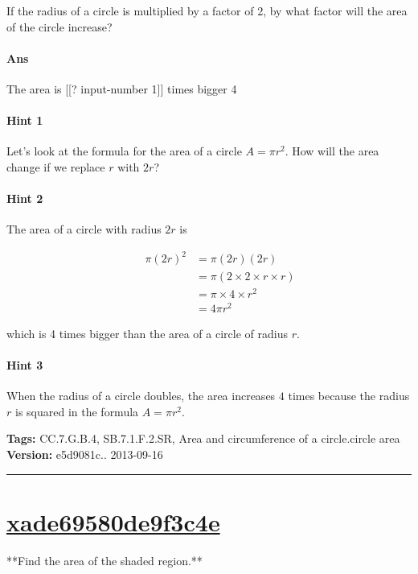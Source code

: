 \documentclass[twocolumn,10pt]{article}
\begin{document}
\noindent
If the radius of a circle is multiplied by a factor of 2, by what factor will the area of the circle increase?

\paragraph{Ans} The area is [[? input-number 1]] times bigger  4

\paragraph{Hint 1}Let's look at the formula for the area of a circle $A=\pi r^2$. 
How will the area change if we replace $r$ with $2r$?

\paragraph{Hint 2}The area of a circle with radius $2r$ is 

\begin{align*}
\qquad \pi (2r)^2 
  & =\pi(2r)(2r) \\
  &=\pi(2 \times 2 \times r \times r)  \\
   &= \pi \times 4 \times r^2 \\
   &= 4\pi r^2
\end{align*} 

which is 4 times bigger than the area of a circle of radius $r$. 


\paragraph{Hint 3}When the radius of a circle doubles, the area increases $4$ times because the radius $r$ is squared in the formula $A=\pi r^2$.




\medskip
\noindent
\textbf{Tags:} {\footnotesize CC.7.G.B.4, SB.7.1.F.2.SR, Area and circumference of a circle.circle area}\\
\textbf{Version:} e5d9081c.. 2013-09-16
\smallskip\hrule





\section{\href{https://www.khanacademy.org/devadmin/content/items/xade69580de9f3c4e}{xade69580de9f3c4e}}

\noindent
**Find the area of the shaded region.**
\end{document}
